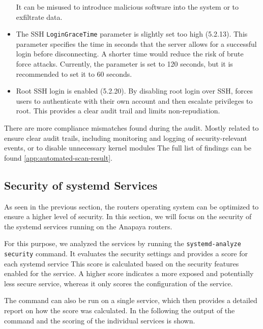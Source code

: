 \begin{itemize}
    It can be misused to introduce malicious software into the system or to exfiltrate data.
    \item The SSH \texttt{LoginGraceTime} parameter is slightly set too high (5.2.13).
    This parameter specifies the time in seconds that the server allows for a successful login before disconnecting.
    A shorter time would reduce the risk of brute force attacks.
    Currently, the parameter is set to 120 seconds, but it is recommended to set it to 60 seconds.
    \item Root SSH login is enabled (5.2.20).
    By disabling root login over SSH, forces users to authenticate with their own account and then escalate privileges to root.
    This provides a clear audit trail and limits non-repudiation.
\end{itemize}


There are more compliance mismatches found during the audit.
Mostly related to ensure clear audit trails, including monitoring and logging of security-relevant events, or to disable unnecessary kernel modules
The full list of findings can be found \cref{app:automated-scan-result}.

\subsection{Security of systemd Services}
\label{sec:systemd-services}
As seen in the previous section, the routers operating system can be optimized to ensure a higher level of security.
In this section, we will focus on the security of the systemd services running on the Anapaya routers.

For this purpose, we analyzed the services by running the \texttt{systemd-analyze security} command.
It evaluates the security settings and provides a score for each systemd service
This score is calculated based on the security features enabled for the service.
A higher score indicates a more exposed and potentially less secure service, whereas it only scores the configuration of the service.

The command can also be run on a single service, which then provides a detailed report on how the score was calculated.
In the following the output of the command and the scoring of the individual services is shown.




